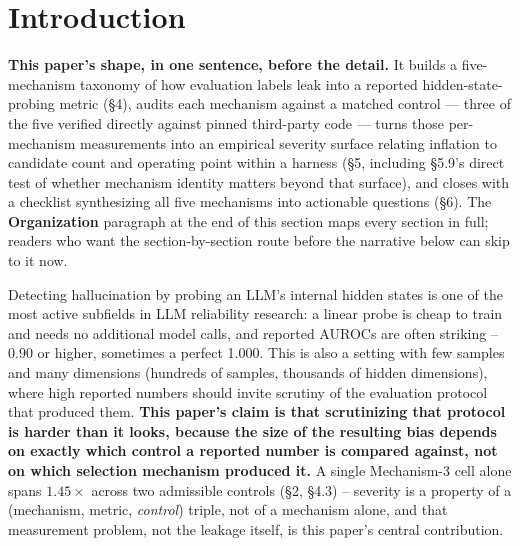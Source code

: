 \documentclass[10pt]{article} %
\begin{document}
\begin{abstract}
Further robustness checks -- an estimator-calibration control, a second
real-feature harness, and a second model family -- are consistent with
this account and do not change the headline severities (§5,
Appendix~\ref{app:corrections-global}). The severity surface is an
empirical fit, not a bound, and whether these estimates transfer to real
hidden states beyond the checks already run is untested. We release a
code-verified five-mechanism taxonomy, this severity relationship, a
label-free calibration guardrail, and an extension of the Kapoor \&
Narayanan/REFORMS leakage checklists -- together with a negative result of
our own: a regex scanner built to automate the checklist yields zero true
positives over $7$ repositories and misses both mechanisms it was built to
catch (§6).
\end{abstract}

\section{Introduction}

\textbf{This paper's shape, in one sentence, before the detail.} It builds a
five-mechanism taxonomy of how evaluation labels leak into a reported
hidden-state-probing metric (§4), audits each mechanism against a matched
control --- three of the five verified directly against pinned third-party
code --- turns those per-mechanism measurements into an empirical severity
surface relating inflation to candidate count and operating point within a
harness (§5, including §5.9's direct test of whether mechanism identity
matters beyond that surface), and closes with a checklist synthesizing all
five mechanisms into actionable questions (§6). The \textbf{Organization}
paragraph at the end of this section maps every section in full; readers
who want the section-by-section route before the narrative below can skip
to it now.

Detecting hallucination by probing an LLM's internal hidden states is one of
the most active subfields in LLM reliability research: a linear probe is cheap
to train and needs no additional model calls, and reported AUROCs are often
striking -- 0.90 or higher, sometimes a perfect 1.000. This is also a setting
with few samples and many dimensions (hundreds of samples, thousands of hidden
dimensions), where high reported numbers should invite scrutiny of the
evaluation protocol that produced them. \textbf{This paper's claim is that
scrutinizing that protocol is harder than it looks, because the size of the
resulting bias depends on exactly which control a reported number is
compared against, not on which selection mechanism produced it.} A single
Mechanism-3 cell alone spans $1.45\times$ across two admissible controls
(§2, §4.3) -- severity is a property of a (mechanism, metric,
\emph{control}) triple, not of a mechanism alone, and that measurement
problem, not the leakage itself, is this paper's central contribution.
\end{document}
